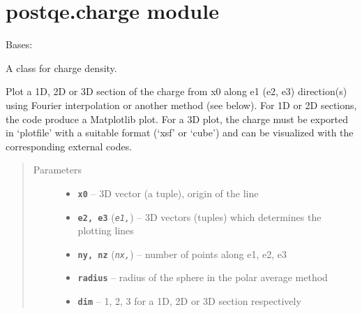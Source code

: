 \documentclass[letterpaper,10pt,english]{sphinxmanual}
\begin{document}
\section{postqe.charge module}
\label{postqe:module-postqe.charge}\label{postqe:postqe-charge-module}

\begin{fulllineitems}
\label{postqe:postqe.charge.Charge}
Bases: 

A class for charge density.

\begin{fulllineitems}
\label{postqe:postqe.charge.Charge.plot}
Plot a 1D, 2D or 3D section of the charge from x0 along e1 (e2, e3) direction(s) using Fourier interpolation
or another method (see below). For 1D or 2D sections, the code produce a Matplotlib plot. For a 3D plot, the
charge must be exported in `plotfile' with a suitable format (`xsf' or `cube') and can be visualized with
the corresponding external codes.
\begin{quote}\begin{description}
\item[{Parameters}] \leavevmode\begin{itemize}
\item {} 
\textbf{\texttt{x0}} -- 3D vector (a tuple), origin of the line

\item {} 
\textbf{\texttt{e2, e3}} (\emph{\texttt{e1,}}) -- 3D vectors (tuples) which determines the plotting lines

\item {} 
\textbf{\texttt{ny, nz}} (\emph{\texttt{nx,}}) -- number of points along e1, e2, e3

\item {} 
\textbf{\texttt{radius}} -- radius of the sphere in the polar average method

\item {} 
\textbf{\texttt{dim}} -- 1, 2, 3 for a 1D, 2D or 3D section respectively


\end{itemize}
\end{description}
\end{quote}
\end{fulllineitems}
\end{fulllineitems}
\end{document}
